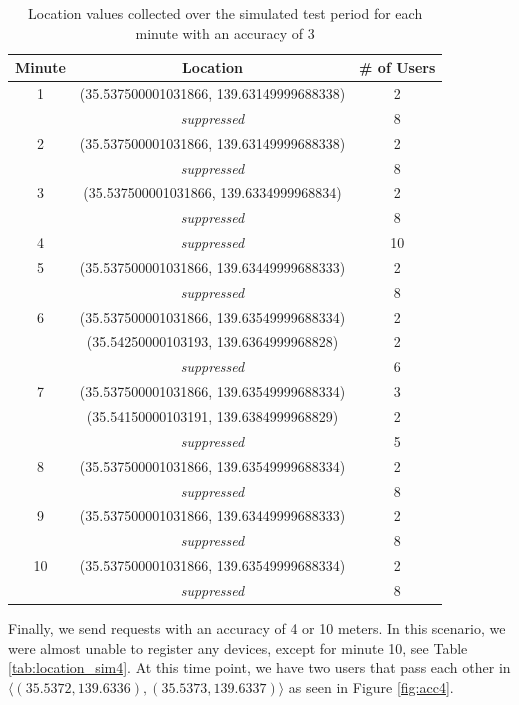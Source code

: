 \begin{table}[htbp]
	\centering
	\begin{tabular}{|c|c|c|} 
		\hline
		\textbf{Minute} & \textbf{Location} & \textbf{\# of Users}\\ [0.5ex] 
		\hline
		1 & (35.537500001031866, 139.63149999688338) & 2 \\ 
		&\textit{suppressed} & 8 \\ 
		\hline
		2 & (35.537500001031866, 139.63149999688338) & 2 \\ 
		&\textit{suppressed} & 8 \\ 
		\hline
		3 & (35.537500001031866, 139.6334999968834) & 2 \\ 
		&\textit{suppressed} & 8 \\ 
		\hline
		4 & \textit{suppressed} & 10 \\
		\hline
		5 & (35.537500001031866, 139.63449999688333) & 2 \\ 
		&\textit{suppressed} & 8 \\ 
		\hline
		6 & (35.537500001031866, 139.63549999688334) & 2 \\ 
		& (35.54250000103193, 139.6364999968828) & 2 \\ 
		&\textit{suppressed} & 6\\
		\hline
		7 & (35.537500001031866, 139.63549999688334) & 3 \\ 
		& (35.54150000103191, 139.6384999968829) & 2 \\ 
		&\textit{suppressed} & 5\\ 
		\hline
		8 & (35.537500001031866, 139.63549999688334) & 2 \\ 
		&\textit{suppressed} & 8 \\ 
		\hline
		9 & (35.537500001031866, 139.63449999688333) & 2 \\ 
		&\textit{suppressed} & 8 \\ 
		\hline
		10 & (35.537500001031866, 139.63549999688334) & 2 \\ 
		&\textit{suppressed} & 8 \\ 
		\hline
	\end{tabular}
	\caption{Location values collected over the simulated test period for each minute with an accuracy of 3}
	\label{tab:location_sim3}
\end{table}

Finally, we send requests with an accuracy of 4 or 10 meters. In this scenario, we were almost unable to register any devices, except for minute 10, see Table \ref{tab:location_sim4}. At this time point, we have two users that pass each other in \(\langle(35.5372, 139.6336),(35.5373, 139.6337)\rangle\) as seen in Figure \ref{fig:acc4}.

